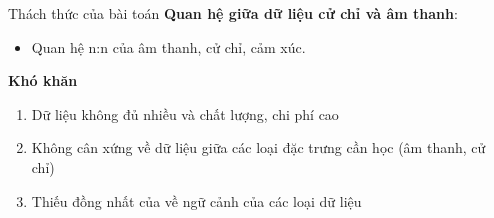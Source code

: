 \begin{frame}{Thách thức của bài toán}
	\textbf{Quan hệ giữa dữ liệu cử chỉ và âm thanh}:
	\begin{itemize}
		\item Quan hệ n:n của âm thanh, cử chỉ, cảm xúc.
	\end{itemize}
	\textbf{Khó khăn}
	\begin{enumerate}
		\item Dữ liệu không đủ nhiều và chất lượng, chi phí cao
		\item Không cân xứng về dữ liệu giữa các loại đặc trưng cần học (âm thanh, cử chỉ)
		\item Thiếu đồng nhất của về ngữ cảnh của các loại dữ liệu
	\end{enumerate}
\end{frame}


%
%



